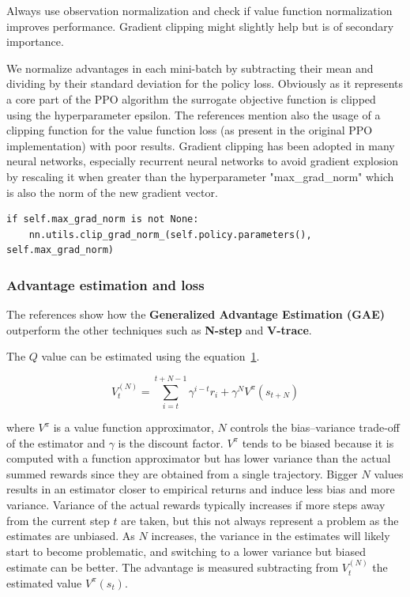 \documentclass[11pt, a4paper, hidelinks]{report}
\begin{document}
\begin{quoting}[font=itshape, begintext={"}, endtext={"\citep{ppo-implementation-2}}]
Always use observation normalization and check if value function normalization improves performance.
Gradient clipping might slightly help but is of secondary importance.
\end{quoting}

We normalize advantages in each mini-batch by subtracting their mean and dividing by their standard deviation for the policy loss.
Obviously as it represents a core part of the PPO algorithm the surrogate objective function is clipped using the hyperparameter epsilon.
The references mention also the usage of a clipping function for the value function loss (as present in the original PPO implementation) with poor results.
Gradient clipping has been adopted in many neural networks, especially recurrent neural networks to avoid gradient explosion by rescaling it when greater than the hyperparameter "max\_grad\_norm" which is also the norm of the new gradient vector.
\begin{lstlisting}[label={lst:gradient-clipping}]
if self.max_grad_norm is not None:
	nn.utils.clip_grad_norm_(self.policy.parameters(), self.max_grad_norm)
\end{lstlisting}

\subsubsection{Advantage estimation and loss}\label{subsubsec:advantage-estimation}

The references show how the \textbf{Generalized Advantage Estimation (GAE)} outperform the other techniques such as \textbf{N-step} and \textbf{V-trace}.

The $Q$ value can be estimated using the equation~\ref{fig:N-step}.
\begin{figure}
	\[ V_t^{(N)} = \sum_{i = t}^{t + N - 1} \gamma^{i - t}r_i + \gamma^{N}V^{\pi}(s_{t + N}) \]
	\caption{}
	\label{fig:N-step}
\end{figure}

where $V^{\pi}$ is a value function approximator, $N$ controls the bias–variance trade-off of the estimator and $\gamma$ is the discount factor.
$V^{\pi}$ tends to be biased because it is computed with a function approximator but has lower variance than the actual summed rewards since they are obtained from a single trajectory.
Bigger $N$ values results in an estimator closer to empirical returns and induce less bias and more variance.
Variance of the actual rewards typically increases if more steps away from the current step $t$ are taken, but this not always represent a problem as the estimates are unbiased.
As $N$ increases, the variance in the estimates will likely start to become problematic, and switching to a lower variance but biased estimate can be better.
The advantage is measured subtracting from $V_t^{(N)}$ the estimated value $V^{\pi}(s_t)$.
\end{document}
